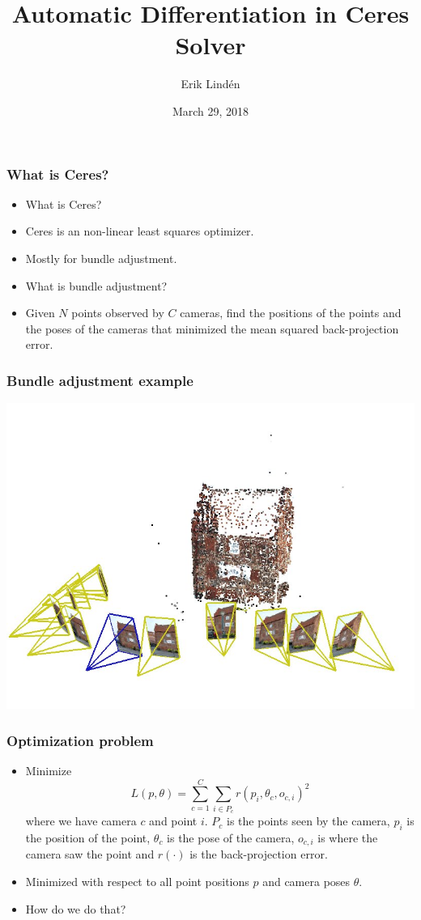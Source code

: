 \documentclass[serif,mathserif]{beamer}
\author[Erik Lind\'en, erlinden@kth.se]{Erik Lind\'en}
\title[Automatic Differentiation in Ceres\hspace{2em}\insertframenumber/\inserttotalframenumber]{Automatic Differentiation in Ceres Solver}
\date{March 29, 2018} %
\institute{KTH / Tobii}
\begin{document}
\maketitle

\begin{frame}
  \frametitle{What is Ceres?}
  \begin{itemize}
  \item What is Ceres? \pause
  \item Ceres is an non-linear least squares optimizer. \pause
  \item Mostly for bundle adjustment. \pause
  \item What is bundle adjustment? \pause
  \item Given $N$ points observed by $C$ cameras, find the positions of the points and the poses of the cameras
  that minimized the mean squared back-projection error.
  \end{itemize}
\end{frame}

\begin{frame}
    \frametitle{Bundle adjustment example}
    \centering
    \includegraphics[width=1\textwidth]{Hus_rec.jpg}
\end{frame}

\begin{frame}
  \frametitle{Optimization problem}
  \begin{itemize}
  \item Minimize
  \[L(p, \theta) = \sum_{c=1}^C \sum_{i \in P_c} r(p_i, \theta_c, o_{c,i})^2 \]
  where  we have camera $c$ and point $i$.
  $P_c$ is the points seen by the camera, $p_i$ is the position of the point, $\theta_c$ is the pose of the camera,
  $o_{c,i}$ is where the camera saw the point and $r(\cdot)$ is the back-projection error. \pause
  \item Minimized with respect to all point positions $p$ and camera poses $\theta$. \pause
  \item How do we do that? 
  \end{itemize}
\end{frame}
\end{document}
